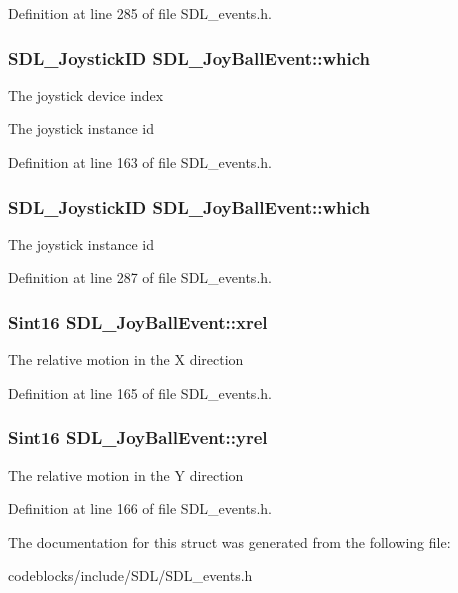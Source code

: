 Definition at line 285 of file S\+D\+L\+\_\+events.\+h.

\hypertarget{structSDL__JoyBallEvent_a4e2e185717d529167cd0bea21093c454}{
\subsubsection[{which}]{\setlength{\rightskip}{0pt plus 5cm}S\+D\+L\+\_\+\+Joystick\+I\+D S\+D\+L\+\_\+\+Joy\+Ball\+Event\+::which}}\label{structSDL__JoyBallEvent_a4e2e185717d529167cd0bea21093c454}
The joystick device index

The joystick instance id 

Definition at line 163 of file S\+D\+L\+\_\+events.\+h.

\hypertarget{structSDL__JoyBallEvent_a4e2e185717d529167cd0bea21093c454}{
\subsubsection[{which}]{\setlength{\rightskip}{0pt plus 5cm}S\+D\+L\+\_\+\+Joystick\+I\+D S\+D\+L\+\_\+\+Joy\+Ball\+Event\+::which}}\label{structSDL__JoyBallEvent_a4e2e185717d529167cd0bea21093c454}
The joystick instance id 

Definition at line 287 of file S\+D\+L\+\_\+events.\+h.

\hypertarget{structSDL__JoyBallEvent_a959a8473aa1964e5e1778c27a9ffd261}{
\subsubsection[{xrel}]{\setlength{\rightskip}{0pt plus 5cm}Sint16 S\+D\+L\+\_\+\+Joy\+Ball\+Event\+::xrel}}\label{structSDL__JoyBallEvent_a959a8473aa1964e5e1778c27a9ffd261}
The relative motion in the X direction 

Definition at line 165 of file S\+D\+L\+\_\+events.\+h.

\hypertarget{structSDL__JoyBallEvent_a28ad48a9eb7a5d3ff62ccba09fcead76}{
\subsubsection[{yrel}]{\setlength{\rightskip}{0pt plus 5cm}Sint16 S\+D\+L\+\_\+\+Joy\+Ball\+Event\+::yrel}}\label{structSDL__JoyBallEvent_a28ad48a9eb7a5d3ff62ccba09fcead76}
The relative motion in the Y direction 

Definition at line 166 of file S\+D\+L\+\_\+events.\+h.



The documentation for this struct was generated from the following file\+:\begin{DoxyCompactItemize}
\item 
codeblocks/include/\+S\+D\+L/S\+D\+L\+\_\+events.\+h\end{DoxyCompactItemize}
